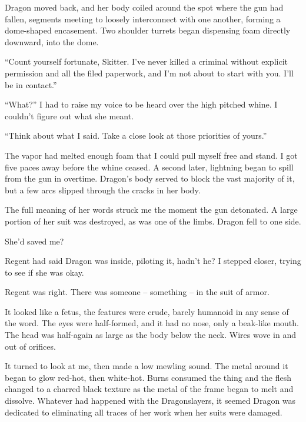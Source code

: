 Dragon moved back, and her body coiled around the spot where the gun had fallen, segments meeting to loosely interconnect with one another, forming a dome-shaped encasement.  Two shoulder turrets began dispensing foam directly downward, into the dome.



``Count yourself fortunate, Skitter.  I've never killed a criminal without explicit permission and all the filed paperwork, and I'm not about to start with you.  I'll be in contact.''



``What?''  I had to raise my voice to be heard over the high pitched whine.  I couldn't figure out what she meant.



``Think about what I said.  Take a close look at those priorities of yours.''



The vapor had melted enough foam that I could pull myself free and stand.  I got five paces away before the whine ceased.  A second later, lightning began to spill from the gun in overtime.  Dragon's body served to block the vast majority of it, but a few arcs slipped through the cracks in her body.



The full meaning of her words struck me the moment the gun detonated.  A large portion of her suit was destroyed, as was one of the limbs.  Dragon fell to one side.



She'd saved me?



Regent had said Dragon was inside, piloting it, hadn't he?  I stepped closer, trying to see if she was okay.



Regent was right.  There was someone – something – in the suit of armor.



It looked like a fetus, the features were crude, barely humanoid in any sense of the word.  The eyes were half-formed, and it had no nose, only a beak-like mouth.  The head was half-again as large as the body below the neck.  Wires wove in and out of orifices.



It turned to look at me, then made a low mewling sound.  The metal around it began to glow red-hot, then white-hot.  Burns consumed the thing and the flesh changed to a charred black texture as the metal of the frame began to melt and dissolve.  Whatever had happened with the Dragonslayers, it seemed Dragon was dedicated to eliminating all traces of her work when her suits were damaged.



